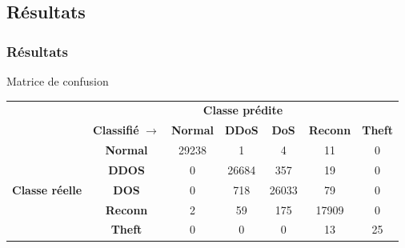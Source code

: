 \documentclass[aspectratio=169,professionalfonts, 12pt]{beamer}
\begin{document}
\subsection{Résultats}
\begin{frame}
  \frametitle{Résultats}
	\begin{block}{Matrice de confusion}
		\begin{table}[H]
\begin{tabular}{ccccccc}
  \toprule
    \multirow{2}{*}{} & \multicolumn{6}{c}{\textbf{Classe prédite}} \\
    \cmidrule{2-7} & \textbf{Classifié}	$\longrightarrow$ & \textbf{Normal} & \textbf{DDoS} & \textbf{DoS} & \textbf{Reconn}& \textbf{Theft} \\
  \midrule
    \multirow{5}{*}{\textbf{Classe réelle}} & \textbf{Normal} & 29238 & 1 & 4 & 11 & 0\\
    \cmidrule{2-7}            & \textbf{DDOS} & 0 & 26684  & 357 & 19 & 0 \\
    \cmidrule{2-7}            & \textbf{DOS} & 0 & 718 & 26033 & 79 & 0  \\
    \cmidrule{2-7}            & \textbf{Reconn} & 2 & 59 & 175 & 17909 & 0 \\
    \cmidrule{2-7}            & \textbf{Theft} & 0 & 0 & 0 & 13 & 25\\
  \bottomrule
\end{tabular}
\end{table}
	\end{block}
\end{frame}
\end{document}
